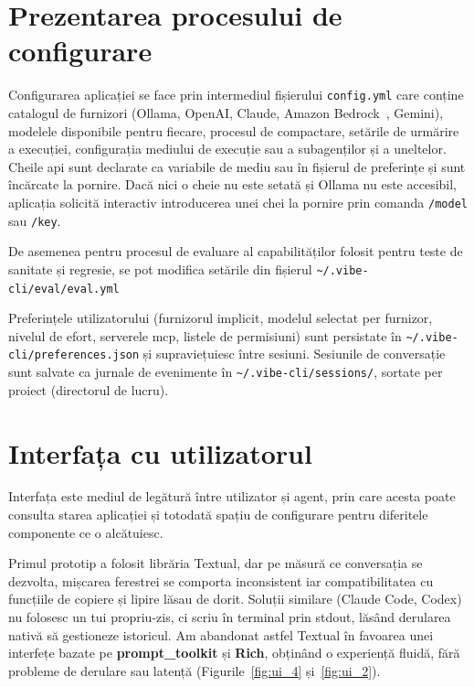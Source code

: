 \documentclass[12pt, a4paper, oneside, romanian]{teza-upb}
\begin{document}
  \section{Prezentarea procesului de configurare}

  Configurarea aplicației se face prin intermediul fișierului \texttt{config.yml} care conține catalogul de furnizori (Ollama, OpenAI, Claude, Amazon Bedrock~\cite{api_bedrock}, Gemini),
  modelele disponibile pentru fiecare, procesul de compactare, setările de urmărire a execuției, configurația mediului de execuție sau a subagenților și a uneltelor.
  Cheile \ac{api} sunt declarate ca variabile de mediu sau în fișierul de preferințe și sunt încărcate la pornire. Dacă nici o cheie nu este setată și Ollama nu este accesibil,
  aplicația solicită interactiv introducerea unei chei la pornire prin comanda \texttt{/model} sau \texttt{/key}.

  De asemenea pentru procesul de evaluare al capabilităților folosit pentru teste de sanitate și regresie, se pot modifica setările din fișierul \texttt{\textasciitilde/.vibe-cli/eval/eval.yml}

  Preferințele utilizatorului (furnizorul implicit, modelul selectat per furnizor, nivelul de efort, serverele \ac{mcp}, listele de permisiuni)
  sunt persistate în \texttt{\textasciitilde/.vibe-cli/preferences.json} și supraviețuiesc între sesiuni.
  Sesiunile de conversație sunt salvate ca jurnale de evenimente în \texttt{\textasciitilde/.vibe-cli/sessions/}, sortate per proiect (directorul de lucru).
  
  \section{Interfața cu utilizatorul}

  Interfața este mediul de legătură între utilizator și agent, prin care acesta poate consulta starea aplicației și totodată spațiu de configurare pentru diferitele componente ce o alcătuiesc.

  Primul prototip a folosit librăria Textual, dar pe măsură ce conversația se dezvolta, mișcarea ferestrei se comporta inconsistent iar compatibilitatea cu funcțiile de copiere și lipire lăsau de dorit. Soluții similare (Claude Code, Codex) nu folosesc un \ac{tui} propriu-zis, ci scriu în terminal prin \ac{stdout}, lăsând derularea nativă să gestioneze istoricul. Am abandonat astfel Textual în favoarea unei interfețe bazate pe \textbf{prompt\_toolkit} și \textbf{Rich}, obținând o experiență fluidă, fără probleme de derulare sau latență (Figurile~\ref{fig:ui_4} și~\ref{fig:ui_2}).
\end{document}
